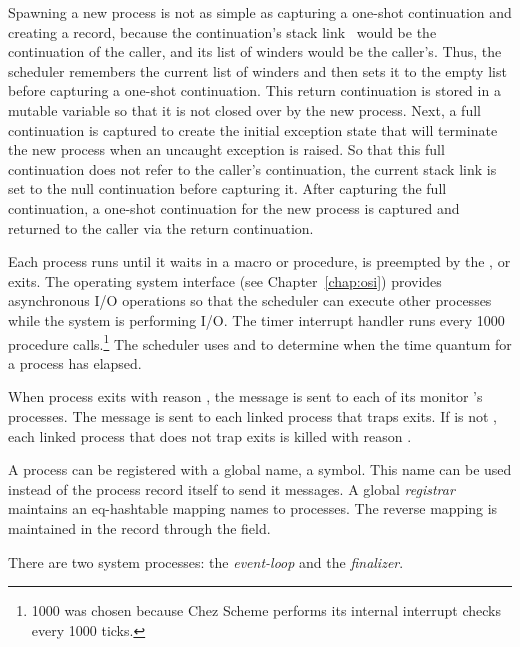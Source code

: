 Spawning a new process is not as simple as capturing a one-shot
continuation and creating a  record, because the
continuation's stack link~\cite{representing-control} would be the
continuation of the caller, and its list of winders would be the
caller's. Thus, the scheduler remembers the current list of winders
and then sets it to the empty list before capturing a one-shot
continuation.  This return continuation is stored in a mutable
variable so that it is not closed over by the new process.  Next, a
full continuation is captured to create the initial exception state
that will terminate the new process when an uncaught exception is
raised. So that this full continuation does not refer to the caller's
continuation, the current stack link is set to the null continuation
before capturing it. After capturing the full continuation, a one-shot
continuation for the new process is captured and returned to the
caller via the return continuation.

Each process runs until it waits in a  macro or
 procedure, is preempted by the
, or exits.  The operating system
interface (see Chapter~\ref{chap:osi}) provides asynchronous I/O
operations so that the scheduler can execute other processes while the
system is performing I/O.  The timer interrupt handler runs every 1000
procedure calls.\footnote{1000 was chosen because Chez Scheme performs
  its internal interrupt checks every 1000 ticks.} The scheduler uses
 and  to determine when
the time quantum for a process has elapsed.

When process  exits with reason , the message
 is sent to each of its
monitor 's  processes.  The message
 is sent to each linked process that
traps exits. If  is not , each linked process
that does not trap exits is killed with reason .

A process can be registered with a global name, a symbol. This name
can be used instead of the process record itself to send it messages.
A global \emph{registrar} maintains an eq-hashtable
mapping names to processes. The reverse mapping is maintained in the
 record through the  field.

There are two system processes: the
\emph{event-loop} and the
\emph{finalizer}.

